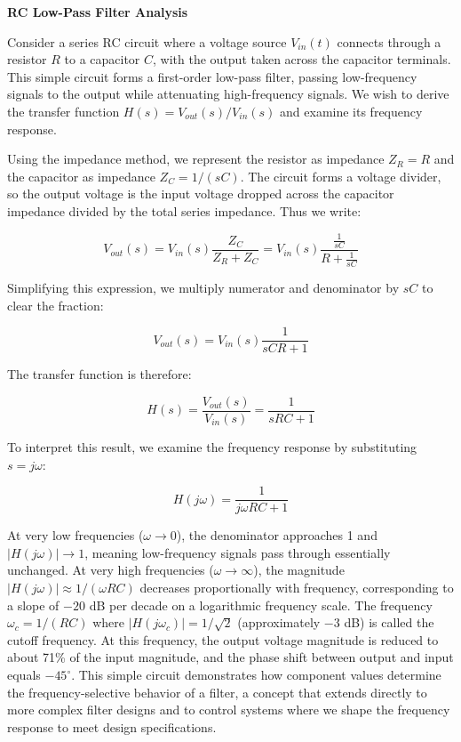 \begin{example}
\textbf{RC Low-Pass Filter Analysis}

Consider a series RC circuit where a voltage source $V_{in}(t)$ connects through a resistor $R$ to a capacitor $C$, with the output taken across the capacitor terminals. This simple circuit forms a first-order low-pass filter, passing low-frequency signals to the output while attenuating high-frequency signals. We wish to derive the transfer function $H(s) = V_{out}(s)/V_{in}(s)$ and examine its frequency response.

Using the impedance method, we represent the resistor as impedance $Z_R = R$ and the capacitor as impedance $Z_C = 1/(sC)$. The circuit forms a voltage divider, so the output voltage is the input voltage dropped across the capacitor impedance divided by the total series impedance. Thus we write:

\begin{equation}
V_{out}(s) = V_{in}(s) \frac{Z_C}{Z_R + Z_C} = V_{in}(s) \frac{\frac{1}{sC}}{R + \frac{1}{sC}}
\end{equation}

Simplifying this expression, we multiply numerator and denominator by $sC$ to clear the fraction:

\begin{equation}
V_{out}(s) = V_{in}(s) \frac{1}{sCR + 1}
\end{equation}

The transfer function is therefore:

\begin{equation}
H(s) = \frac{V_{out}(s)}{V_{in}(s)} = \frac{1}{sRC + 1}
\end{equation}

To interpret this result, we examine the frequency response by substituting $s = j\omega$:

\begin{equation}
H(j\omega) = \frac{1}{j\omega RC + 1}
\end{equation}

At very low frequencies ($\omega \to 0$), the denominator approaches 1 and $|H(j\omega)| \to 1$, meaning low-frequency signals pass through essentially unchanged. At very high frequencies ($\omega \to \infty$), the magnitude $|H(j\omega)| \approx 1/(\omega RC)$ decreases proportionally with frequency, corresponding to a slope of $-20$ dB per decade on a logarithmic frequency scale. The frequency $\omega_c = 1/(RC)$ where $|H(j\omega_c)| = 1/\sqrt{2}$ (approximately $-3$ dB) is called the cutoff frequency. At this frequency, the output voltage magnitude is reduced to about 71\% of the input magnitude, and the phase shift between output and input equals $-45^\circ$. This simple circuit demonstrates how component values determine the frequency-selective behavior of a filter, a concept that extends directly to more complex filter designs and to control systems where we shape the frequency response to meet design specifications.


\end{example}
